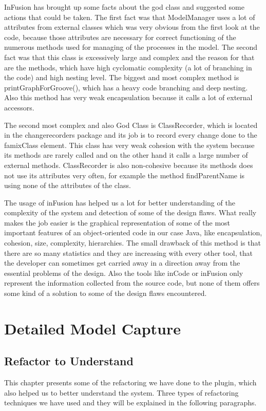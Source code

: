 \documentclass[a4paper]{article}
\begin{document}
InFusion has brought up some facts about the god class and suggested some actions that could be taken. The first fact was that ModelManager uses a lot of attributes from external classes which was very obvious from the first look at the code, because those attributes are necessary for correct functioning of the numerous methods used for managing of the processes in the model. The second fact was that this class is excessively large and complex and the reason for that are the methods, which have high cyclomatic complexity (a lot of branching in the code) and high nesting level. The biggest and most complex method is printGraphForGroove(), which has a heavy code branching and deep nesting. Also this method has very weak encapsulation because it calls a lot of external accessors.

The second most complex and also God Class is ClassRecorder, which is located in the changerecorders package and its job is to record every change done to the famixClass element. This class has very weak cohesion with the system because its methods are rarely called and on the other hand it calls a large number of external methods. ClassRecorder is also non-cohesive because its methods does not use its attributes very often, for example the method findParentName is using none of the attributes of the class.

The usage of inFusion has helped us a lot for better understanding of the complexity of the system and detection of some of the design flaws. What really makes the job easier is the graphical representation of some of the most important features of an object-oriented code in our case Java, like encapsulation, cohesion, size, complexity, hierarchies. The small drawback of this method is that there are so many statistics and they are increasing with every other tool, that the developer can sometimes get carried away in a direction away from the essential problems of the design. Also the tools like inCode or inFusion only represent the information collected from the source code, but none of them offers some kind of a solution to some of the design flaws encountered.

\section{Detailed Model Capture}
\subsection{Refactor to Understand}
This chapter presents some of the refactoring we have done to the plugin, which also helped us to better understand the system. Three types of refactoring techniques we have used and they will be explained in the following paragraphs.
\end{document}
